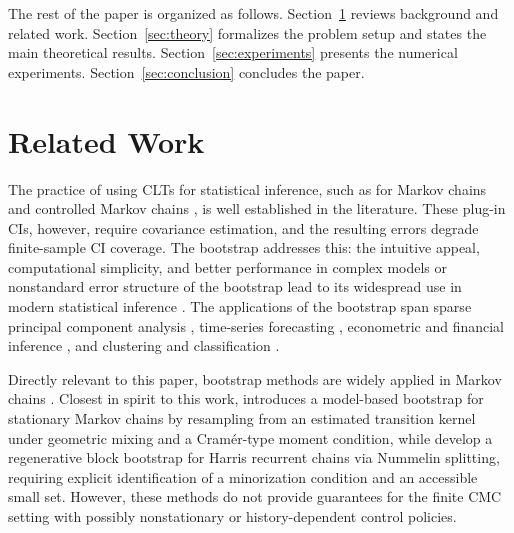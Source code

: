 \documentclass{article}
\numberwithin{equation}{section}
\begin{document}
The rest of the paper is organized as follows. Section~\ref{sec:background} reviews background and related work. 
Section~\ref{sec:theory} formalizes the problem setup and states the main theoretical results. 
Section~\ref{sec:experiments} presents the numerical experiments.
Section~\ref{sec:conclusion} concludes the paper. 



\section{Related Work}
\label{sec:background}
The practice of using CLTs for statistical inference, such as for Markov chains and controlled Markov chains \citep{billingsley1961statistical,zhu2024uncertainty,su2025centrallimittheoremstransition}, is well established in the literature.
These plug-in CIs, however, require covariance estimation, and the resulting errors degrade finite-sample CI coverage.
The bootstrap addresses this: the intuitive appeal, computational simplicity, and better performance in complex models or nonstandard error structure of the bootstrap \citep{hall1992mean} lead to its widespread use in modern statistical inference \citep{modayil2004towards,han2016bootstrap,nakkiran2020deep}.
The applications of the bootstrap span sparse principal component analysis \citep{babamoradi2013bootstrap,rahoma2021sparse}, time-series forecasting \citep{ruiz2002bootstrapping}, econometric and financial inference \citep{horowitz2019bootstrap,gonccalves2023bootstrapping}, and clustering and classification \citep{jedra2023nearly,jain1987bootstrap}.

Directly relevant to this paper, bootstrap methods are widely applied in Markov chains \citep{kulperger1989bootstrapping,athreya1992bootstrapping}.
Closest in spirit to this work, \citet{horowitz2003bootstrap} introduces a model-based bootstrap for stationary Markov chains by resampling from an estimated transition kernel under geometric mixing and a Cram\'{e}r-type moment condition, while \citet{bertail2006regenerative} develop a regenerative block bootstrap for Harris recurrent chains via Nummelin splitting, requiring explicit identification of a minorization condition and an accessible small set. 
However, these methods do not provide guarantees for the finite CMC setting with possibly nonstationary or history-dependent control policies.
\end{document}
